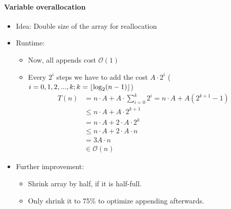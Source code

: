 \documentclass[12pt, a4paper]{scrartcl}
\newcommand{\bigO}{\mathcal{O}}
\DeclarePairedDelimiter{\floor}{\lfloor}{\rfloor}
\begin{document}
\paragraph{Variable overallocation}
\begin{itemize}
\item Idea: Double size of the array for reallocation
\item Runtime:
  \begin{itemize}
  \item Now, all appends cost $\bigO(1)$
  \item Every $2^i$ steps we have to add the cost $A\cdot2^i$ ($i=0,1,2,...,k; k=\floor{\log_2(n-1)}$)
    \begin{align*}
      T(n)&=n\cdot A+ A\cdot\sum^k_{i=0}2^i=n\cdot A+A(2^{k+1}-1)\\
          &\le n\cdot A+ A\cdot 2^{k+1}\\
          &=n\cdot A + 2\cdot A\cdot 2^k\\
          &\le n\cdot A + 2\cdot A\cdot n\\
          &=3A\cdot n\\
          &\in\bigO(n)
    \end{align*}
  \end{itemize}
\item Further improvement:
  \begin{itemize}
  \item Shrink array by half, if it is half-full.
  \item Only shrink it to 75\% to optimize appending afterwards.
  \end{itemize}
\end{itemize}
\end{document}
